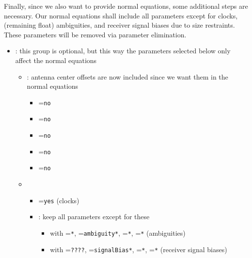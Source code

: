 Finally, since we also want to provide normal equations, some additional steps are necessary. Our normal equations shall
include all parameters except for clocks, (remaining float) ambiguities, and receiver signal biases due to size restraints.
These parameters will be removed via parameter elimination.
\begin{itemize}
  \item {}: this group is optional, but this way the
        parameters selected below only affect the normal equations
  \begin{itemize}
    \item {}: antenna center offsets
          are now included since we want them in the normal equations
    \begin{itemize}
      \item {}=\verb|no|
      \item {}=\verb|no|
      \item {}=\verb|no|
      \item {}=\verb|no|
      \item {}=\verb|no|
    \end{itemize}
    \item {}
    \begin{itemize}
      \item {}=\verb|yes| (clocks)
      \item {}: keep all parameters except for these
      \begin{itemize}
        \item {} with =\verb|*|,
            =\verb|ambiguity*|, =\verb|*|, =\verb|*| (ambiguities)
        \item {} with =\verb|????|,
              =\verb|signalBias*|, =\verb|*|, =\verb|*| (receiver signal biases)
      \end{itemize}
    \end{itemize}
  \end{itemize}
\end{itemize}

